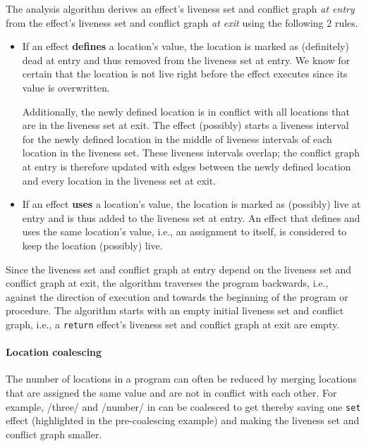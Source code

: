 \documentclass[main.tex]{subfiles}
\begin{document}
The analysis algorithm derives an effect's liveness set and conflict graph \emph{at entry} from the effect's liveness set and conflict graph \emph{at exit} using the following 2 rules.

\begin{itemize}
	
	\item If an effect \textbf{defines} a location's value, the location is marked as (definitely) dead at entry and thus removed from the liveness set at entry. We know for certain that the location is not live right before the effect executes since its value is overwritten.
	
	Additionally, the newly defined location is in conflict with all locations that are in the liveness set at exit. The effect (possibly) starts a liveness interval for the newly defined location in the middle of liveness intervals of each location in the liveness set. These liveness intervals overlap; the conflict graph at entry is therefore updated with edges between the newly defined location and every location in the liveness set at exit.
	
	\item If an effect \textbf{uses} a location's value, the location is marked as (possibly) live at entry and is thus added to the liveness set at entry. An effect that defines and uses the same location's value, i.e., an assignment to itself, is considered to keep the location (possibly) live.
	
\end{itemize}

Since the liveness set and conflict graph at entry depend on the liveness set and conflict graph at exit, the algorithm traverses the program backwards, i.e., against the direction of execution and towards the beginning of the program or procedure. The algorithm starts with an empty initial liveness set and conflict graph, i.e., a \texttt{return} effect's liveness set and conflict graph at exit are empty.

\paragraph{Location coalescing} The number of locations in a program can often be reduced by merging locations that are assigned the same value and are not in conflict with each other. For example, \iil/three/ and \iil/number/ in
can be coalesced to get
thereby saving one \texttt{set} effect (highlighted in the pre-coalescing example) and making the liveness set and conflict graph smaller.
\end{document}
